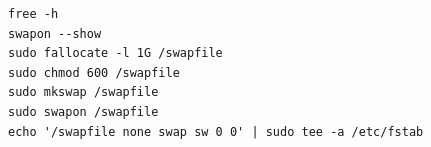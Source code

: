 \begin{code}[title=Swap分配]
	\begin{verbatim}
free -h
swapon --show
sudo fallocate -l 1G /swapfile
sudo chmod 600 /swapfile
sudo mkswap /swapfile
sudo swapon /swapfile
echo '/swapfile none swap sw 0 0' | sudo tee -a /etc/fstab
    \end{verbatim}
\end{code}
